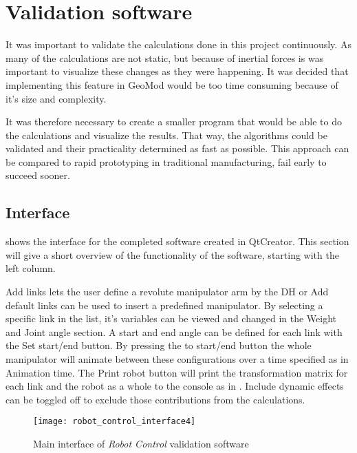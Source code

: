 \chapter{Validation software}

It was important to validate the calculations done in this project continuously. As many of the calculations are not static, but because of inertial forces is was important to visualize these changes as they were happening. It was decided that implementing this feature in GeoMod would be too time consuming because of it's size and complexity. 

It was therefore necessary to create a smaller program that would be able to do the calculations and visualize the results. That way, the algorithms could be validated and their practicality determined as fast as possible. This approach can be compared to rapid prototyping in traditional manufacturing, fail early to succeed sooner.


\section{Interface}\label{interfaceSec}

 shows the interface for the completed software created in QtCreator. This section will give a short overview of the functionality of the software, starting with the left column.

\textsf{Add links} lets the user define a revolute manipulator arm by the \gls{DH} or \textsf{Add default links} can be used to insert a predefined manipulator. By selecting a specific link in the list, it's variables can be viewed and changed in the \textsf{Weight} and \textsf{Joint angle} section. A start and end angle can be defined for each link with the \textsf{Set start/end} button. By pressing the \textsf{to start/end} button the whole manipulator will animate between these configurations over a time specified as in \textsf{Animation time}. The \textsf{Print robot} button will print the transformation matrix for each link and the robot as a whole to the console as in . \textsf{Include dynamic effects} can be toggled off to exclude those contributions from the calculations.

\begin{figure}[h!]
    \centering
    \texttt{[image: robot\_control\_interface4]}
    \caption{Main interface of \textit{Robot Control} validation software}
    \label{interface}
\end{figure}

